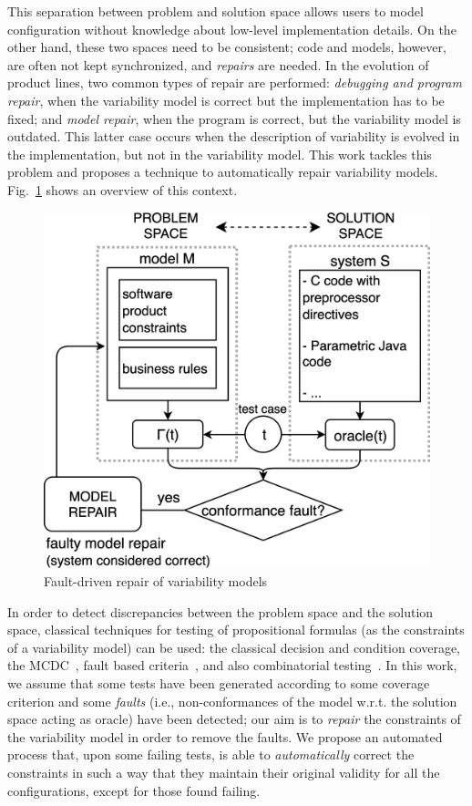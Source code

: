 \begin{tikzborder}{\cite{Gargantini16:validation}}
\begin{tikzborder}{\cite{gargantini_combinatorial_2017}}
\begin{tikzborder}{\cite{garn2019}}
\begin{tikzborder}{\cite{arcaini2019achieving}}
	This separation between problem and solution space allows users to model configuration without knowledge about low-level implementation details. On the other hand, these two spaces need to be consistent; code and models, however, are often not kept synchronized, and {\it repairs} are needed. In the evolution of product lines, two common types of repair are performed: \textit{debugging and program repair}, when the variability model is correct but the implementation has to be fixed; and \textit{model repair}, when the program is correct, but the variability model is outdated. This latter case occurs when the description of variability is evolved in the implementation, but not in the variability model. This work tackles this problem and proposes a technique to automatically repair variability models. Fig.~\ref{fig:problem_solution} shows an overview of this context.
	\begin{figure}[!htb]
		\centering
		\includegraphics[width=.7\columnwidth]{images/problemSolution_new.png}
		\caption{Fault-driven repair of variability models}
		\label{fig:problem_solution}
	\end{figure}
	
	In order to detect discrepancies between the problem space and the solution space, classical techniques for testing of propositional formulas (as the constraints of a variability model) can be used: the classical decision and condition coverage, the MCDC~\cite{sej.1994.0025}, fault based criteria~\cite{compj15}, and also combinatorial testing~\cite{icst2015}. In this work, we assume that some tests have been generated according to some coverage criterion and some \emph{faults} (i.e., non-conformances of the model w.r.t. the solution space acting as oracle) have been detected; our aim is to \emph{repair} the constraints of the variability model in order to remove the faults. We propose an automated process that, upon some failing tests, is able to \emph{automatically} correct the constraints in such a way that they maintain their original validity for all the configurations, except for those found failing.
	

\end{tikzborder}
\end{tikzborder}
\end{tikzborder}
\end{tikzborder}
